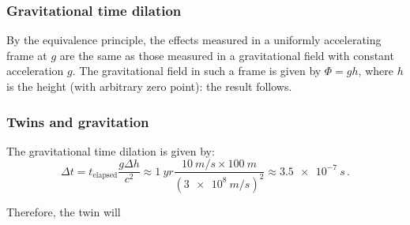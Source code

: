 \documentclass[main.tex]{subfiles}
\begin{document}
\subsubsection{Gravitational time dilation}

By the equivalence principle, the effects measured in a uniformly accelerating frame at \(g\) are the same as those measured in a gravitational field with constant acceleration \(g\).
The gravitational field in such a frame is given by \(\Phi  = gh\), where \(h\) is the height (with arbitrary zero point): the result follows.

\subsubsection{Twins and gravitation}

The gravitational time dilation is given by: 
%
\begin{equation}
  \Delta t = t _{\text{elapsed}} \frac{g \Delta h}{c^2}
  \approx \SI{1}{yr} \frac{\SI{10}{m/s} \times \SI{100}{m}}{(\SI{3e8}{m/s})^2} \approx \SI{3.5e-7}{s} 
\,.
\end{equation}

Therefore, the twin will 
\end{document}
